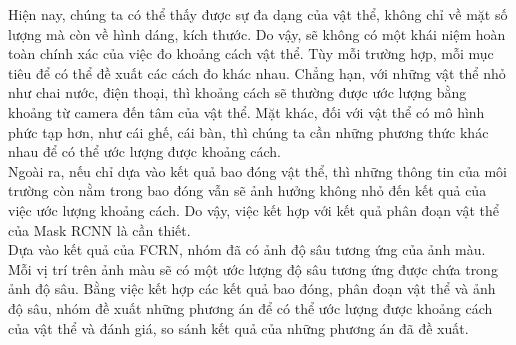 Hiện nay, chúng ta có thể thấy được sự đa dạng của vật thể, không chỉ về mặt số lượng mà còn về hình dáng, kích thước. Do vậy, sẽ không có một khái niệm hoàn toàn chính xác của việc đo khoảng cách vật thể. Tùy mỗi trường hợp, mỗi mục tiêu để có thể đề xuất các cách đo khác nhau. Chẳng hạn, với những vật thể nhỏ như chai nước, điện thoại, thì khoảng cách sẽ thường được ước lượng bằng khoảng từ camera đến tâm của vật thể. Mặt khác, đối với vật thể có mô hình phức tạp hơn, như cái ghế, cái bàn, thì chúng ta cần những phương thức khác nhau để có thể ước lượng được khoảng cách.\\

Ngoài ra, nếu chỉ dựa vào kết quả bao đóng vật thể, thì những thông tin của môi trường còn nằm trong bao đóng vẫn sẽ ảnh hưởng không nhỏ đến kết quả của việc ước lượng khoảng cách. Do vậy, việc kết hợp với kết quả phân đoạn vật thể của Mask RCNN là cần thiết. \\

Dựa vào kết quả của FCRN, nhóm đã có ảnh độ sâu tương ứng của ảnh màu. Mỗi vị trí trên ảnh màu sẽ có một ước lượng độ sâu tương ứng được chứa trong ảnh độ sâu. Bằng việc kết hợp các kết quả bao đóng, phân đoạn vật thể và ảnh độ sâu, nhóm đề xuất những phương án để có thể ước lượng được khoảng cách của vật thể và đánh giá, so sánh kết quả của những phương án đã đề xuất. 

